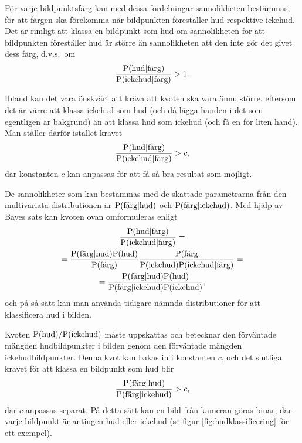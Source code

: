 \documentclass[../rapport_MVEX01-11-05]{subfiles}
\begin{document}
För varje bildpunktsfärg kan med dessa fördelningar sannolikheten bestämmas,
för att färgen ska förekomma när bildpunkten föreställer hud
respektive ickehud. Det är rimligt att klassa en bildpunkt som
hud om sannolikheten för att bildpunkten föreställer hud är större än
sannolikheten att den inte gör det givet dess färg, d.v.s.~om
\begin{equation*}
	\frac{\mathrm{P}(\textrm{hud}|\textrm{färg})}{\mathrm{P}(\textrm{ickehud}|\textrm{färg})} > 1.
\end{equation*}

Ibland kan det vara önskvärt att kräva att kvoten ska vara ännu
större, eftersom det är värre att klassa ickehud som hud (och då lägga
handen i det som egentligen är bakgrund) än att klassa hud som ickehud
(och få en för liten hand). Man ställer därför istället kravet 
\begin{equation*}
	\frac{\mathrm{P}(\textrm{hud}|\textrm{färg})}{\mathrm{P}(\textrm{ickehud}|\textrm{färg})} > c,
\end{equation*}
där konstanten $c$ kan anpassas för att få så bra resultat som möjligt.


De sannolikheter som kan bestämmas med de skattade parametrarna från den
multivariata distributionen är
$\mathrm{P}(\textrm{färg}|\textrm{hud})$ och
$\mathrm{P}(\textrm{färg}|\textrm{ickehud})$. Med hjälp av Bayes sats
kan kvoten ovan omformuleras enligt
\begin{multline*}
\frac{\mathrm{P}(\textrm{hud}|\textrm{färg})}{\mathrm{P}(\textrm{ickehud}|\textrm{färg})}=\\
=\frac{\mathrm{P}(\textrm{färg}|\textrm{hud})\mathrm{P}(\textrm{hud})}{\mathrm{P}(\textrm{färg})}
 \frac{\mathrm{P}(\textrm{färg}}{\mathrm{P}(\textrm{ickehud})\mathrm{P}(\textrm{ickehud}|\textrm{färg})}=\\
=\frac{\mathrm{P}(\textrm{färg}|\textrm{hud})\mathrm{P}(\textrm{hud})}{\mathrm{P}(\textrm{färg}|\textrm{ickehud})
 \mathrm{P}(\textrm{ickehud})},
\end{multline*}
och på så sätt kan man använda tidigare nämnda distributioner för att
klassificera hud i bilden. 

Kvoten $\mathrm{P}(\textrm{hud})/\mathrm{P}(\textrm{ickehud})$ måste uppskattas
och betecknar
den förväntade mängden hudbildpunkter i bilden genom den förväntade mängden
ickehudbildpunkter. Denna kvot kan bakas in i konstanten $c$, och 
det slutliga kravet för att klassa en bildpunkt som hud blir
\begin{equation*}
	\frac{\mathrm{P}(\textrm{färg}|\textrm{hud})}{\mathrm{P}(\textrm{färg}|\textrm{ickehud})} > c,
\end{equation*}
där $c$ anpassas separat. På detta sätt kan en bild från kameran göras
binär, där varje bildpunkt är antingen hud eller ickehud (se figur
\vref{fig:hudklassificering} för ett exempel).
\end{document}
